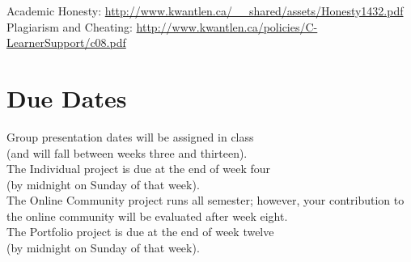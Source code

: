 \documentclass[letterpaper,10pt,headsepline]{scrreprt}
\begin{document}
\noindent
Academic Honesty: \url{http://www.kwantlen.ca/__shared/assets/Honesty1432.pdf}\\
Plagiarism and Cheating: \url{http://www.kwantlen.ca/policies/C-LearnerSupport/c08.pdf}
\clearpage
\section{Due Dates}

Group presentation dates will be assigned in class \\(and will fall between weeks three and thirteen).
\noindent\\
The Individual project is due at the end of week four \\(by midnight on Sunday of that week).
\noindent\\
The Online Community project runs all semester; however, your contribution to the online community will be evaluated after week eight.
\noindent\\
The Portfolio project is due at the end of week twelve \\(by midnight on Sunday of that week).
\end{document}
